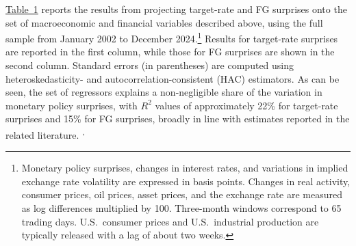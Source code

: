\documentclass[12pt, reqno]{article}
\begin{document}
\hyperlink{Table 1}{Table~1} reports the results from projecting target-rate and FG surprises onto the set of macroeconomic and financial variables described above, using the full sample from January 2002 to December 2024.\footnote{Monetary policy surprises, changes in interest rates, and variations in implied exchange rate volatility are expressed in basis points. Changes in real activity, consumer prices, oil prices, asset prices, and the exchange rate are measured as log differences multiplied by 100. Three-month windows correspond to 65 trading days. U.S.\ consumer prices and U.S.\ industrial production are typically released with a lag of about two weeks.} Results for target-rate surprises are reported in the first column, while those for FG surprises are shown in the second column. Standard errors (in parentheses) are computed using heteroskedasticity- and autocorrelation-consistent (HAC) estimators. As can be seen, the set of regressors explains a non-negligible share of the variation in monetary policy surprises, with $R^2$ values of approximately 22\% for target-rate surprises and 15\% for FG surprises, broadly in line with estimates reported in the related literature.\footnotemark
{}\textsuperscript{,}\footnotemark
{}
\end{document}
